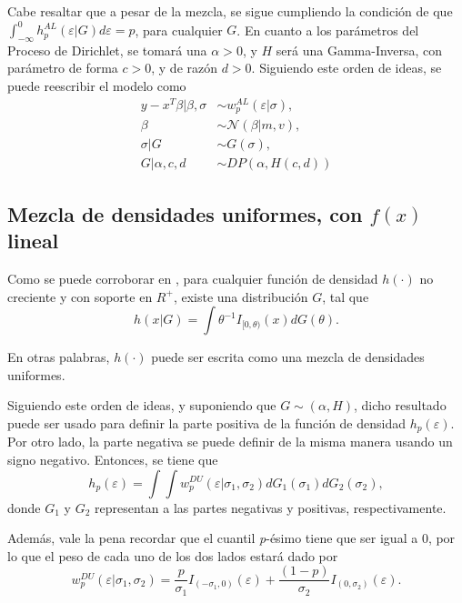 Cabe resaltar que a pesar de la mezcla, se sigue cumpliendo la condici\'on de que $\int_{-\infty}^0 h_p^{AL}(\varepsilon|G) d\varepsilon = p$, para cualquier $G$. En cuanto a los par\'ametros del Proceso de Dirichlet, se tomar\'a una $\alpha > 0$, y $H$ ser\'a una Gamma-Inversa, con par\'ametro de forma $c > 0$, y de raz\'on $d > 0$. Siguiendo este orden de ideas, se puede reescribir el modelo como
\begin{equation*}
\begin{aligned}
    y-x^T \beta | \beta, \sigma &\sim w_p^{AL}(\varepsilon | \sigma), \\
    \beta &\sim \mathcal{N}(\beta | m,v), \\
    \sigma | G &\sim G(\sigma), \\
    G | \alpha, c, d &\sim DP(\alpha, H(c,d))
\end{aligned}
\end{equation*}

\subsection{Mezcla de densidades uniformes, con $f(x)$ lineal}

Como se puede corroborar en \cite{Pavlides_NonparamMixUnifDens}, para cualquier funci\'on de densidad $h(\cdot)$ no creciente y con soporte en $R^{+}$, existe una distribuci\'on $G$, tal que
\begin{equation*}
    h(x|G) = \int \theta^{-1} I_{[0,\theta)} (x) dG(\theta).
\end{equation*}

En otras palabras, $h(\cdot)$ puede ser escrita como una mezcla de densidades uniformes.

Siguiendo este orden de ideas, y suponiendo que $G \sim (\alpha, H)$, dicho resultado puede ser usado para definir la parte positiva de la funci\'on de densidad $h_p(\varepsilon)$. Por otro lado, la parte negativa se puede definir de la misma manera usando un signo negativo. Entonces, se tiene que
\begin{equation*}
    h_p(\varepsilon) = \int \int w_p^{DU}(\varepsilon|\sigma_1,\sigma_2)dG_1(\sigma_1)dG_2(\sigma_2),
\end{equation*}
donde $G_1$ y $G_2$ representan a las partes negativas y positivas, respectivamente.

Adem\'as, vale la pena recordar que el cuantil \textit{p}-\'esimo tiene que ser igual a $0$, por lo que el peso de cada uno de los dos lados estar\'a dado por
\begin{equation*}
    w_p^{DU}(\varepsilon|\sigma_1,\sigma_2) =
    \frac{p}{\sigma_1} I_{(-\sigma_1,0)}(\varepsilon) + 
    \frac{(1-p)}{\sigma_2} I_{(0,\sigma_2)}(\varepsilon).
\end{equation*}

